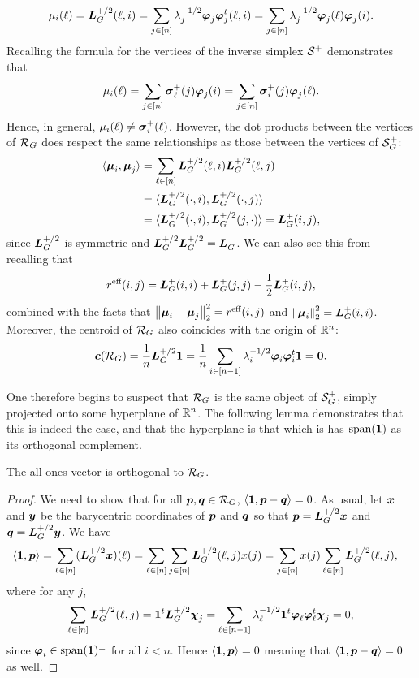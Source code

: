 \begin{align*}
\mu_i(\ell) = \vb*{L}_G^{+/2}(\ell,i) = \sum_{j\in[n]}\lambda_j^{-1/2}\vb*{\varphi}_j\vb*{\varphi}_j^t(\ell,i) = \sum_{j\in[n]}\lambda_j^{-1/2}\vb*{\varphi}_j(\ell)\vb*{\varphi}_j(i).
\end{align*}
Recalling the formula for the vertices of the inverse simplex $\mathcal{S}^+$ demonstrates that 
\begin{equation*}
\mu_i(\ell) = \sum_{j\in[n]}\vb*{\sigma}_\ell^+(j)\vb*{\varphi}_j(i) = \sum_{j\in[n]}\vb*{\sigma}_i^+(j)\vb*{\varphi}_j(\ell).
\end{equation*}
Hence, in general, $\mu_i(\ell)\neq \vb*{\sigma}_i^+(\ell)$. However, the dot products between the vertices of $\mathcal{R}_G$ does respect  the same relationships as those between the vertices of $\mathcal{S}_G^+$:
\begin{align*}
\langle \vb*{\mu}_i,\vb*{\mu}_j\rangle &=\sum_{\ell\in[n]} \vb*{L}_G^{+/2}(\ell,i)\vb*{L}_G^{+/2}(\ell,j) \\
&= \langle \vb*{L}_G^{+/2}(\cdot,i),\vb*{L}_G^{+/2}(\cdot,j)\rangle \\
&=\langle \vb*{L}_G^{+/2}(\cdot,i),\vb*{L}_G^{+/2}(j,\cdot)\rangle= \vb*{L}_G^+(i,j),
\end{align*}
since $\vb*{L}_G^{+/2}$ is symmetric and  $\vb*{L}_G^{+/2}\vb*{L}_G^{+/2}=\vb*{L}_G^+$.  We can also see this from recalling that 
\[r^{\text{eff}}(i,j) = \vb*{L}_G^+(i,i) + \vb*{L}_G^+(j,j) - \frac{1}{2}\vb*{L}_G^+(i,j),\]
combined with the facts that $\norm{\vb*{\mu}_i-\vb*{\mu}_j}_2^2 = r^{\text{eff}}(i,j)$ and $\norm{\vb*{\mu}_i}_2^2 = \vb*{L}_G^+(i,i)$. Moreover, the centroid of $\mathcal{R}_G$ also coincides with the origin  of $\mathbb{R}^n$: 
\begin{equation*}
\vb*{c}(\mathcal{R}_G) = \frac{1}{n}\vb*{L}_G^{+/2}\vb{1} = \frac{1}{n}\sum_{i\in[n-1]}\lambda_i^{-1/2}\vb*{\varphi}_i\vb*{\varphi}_i^t \vb{1} = \vb{0}.
\end{equation*}

One therefore begins to suspect that $\mathcal{R}_G$ is the same object of  $\mathcal{S}_G^+$, simply projected onto some hyperplane of $\mathbb{R}^n$. The following lemma  demonstrates that this is indeed the  case, and  that  the hyperplane  is that which is has $\textnormal{span}(\vb{1})$ as its orthogonal complement.  

\begin{lemma}
	The all ones vector is orthogonal to $\mathcal{R}_G$. 
\end{lemma}
\begin{proof}
	We need to show that for all $\vb*{p},\vb*{q}\in\mathcal{R}_G$, $\langle \vb{1},\vb*{p}-\vb*{q}\rangle=0$. As usual, let $\vb*{x}$ and $\vb*{y}$ be the barycentric coordinates of $\vb*{p}$ and $\vb*{q}$ so that $\vb*{p}=\vb*{L}_G^{+/2}\vb*{x}$ and $\vb*{q}=\vb*{L}_G^{+/2}\vb*{y}$. We have
	\begin{align*}
	\langle \vb{1},\vb*{p}\rangle &= \sum_{\ell\in[n]} (\vb*{L}_G^{+/2}\vb*{x})(\ell) = \sum_{\ell\in[n]} \sum_{j\in [n]}\vb*{L}_G^{+/2}(\ell,j)x(j) = \sum_{j\in[n]}x(j) \sum_{\ell\in[n]}\vb*{L}_G^{+/2}(\ell,j),
	\end{align*}
	where for any $j$, 
	\[\sum_{\ell\in[n]}\vb*{L}_G^{+/2}(\ell,j)= \vb{1}^t \vb*{L}_G^{+/2}\boldsymbol{\chi}_j=\sum_{\ell\in[n-1]} \lambda_\ell^{-1/2}\vb{1}^t \vb*{\varphi}_\ell\vb*{\varphi}_\ell^t\boldsymbol{\chi}_j=0,\]
	since $\vb*{\varphi}_i\in\textnormal{span}(\vb{1})^\perp$  for all $i<n$. Hence  $\langle \vb{1},\vb*{p}\rangle=0$ meaning that $\langle \vb{1},\vb*{p}-\vb*{q}\rangle=0$ as well. 
\end{proof}

